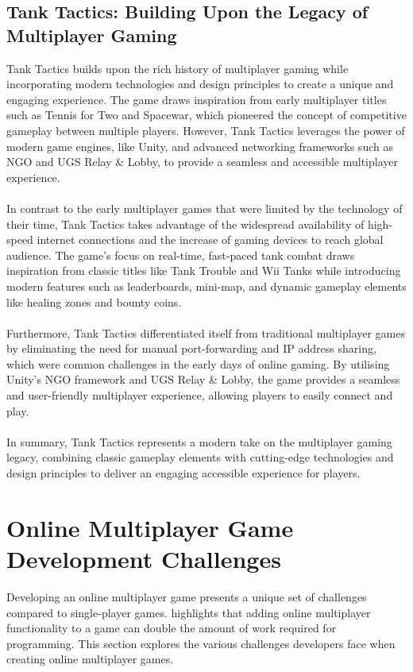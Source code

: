 \subsection{Tank Tactics: Building Upon the Legacy of Multiplayer Gaming}
Tank Tactics builds upon the rich history of multiplayer gaming while incorporating modern technologies and design principles to create a unique and engaging experience. The game draws inspiration from early multiplayer titles such as Tennis for Two and Spacewar, which pioneered the concept of competitive gameplay between multiple players. However, Tank Tactics leverages the power of modern game engines, like Unity, and advanced networking frameworks such as NGO and UGS Relay \& Lobby, to provide a seamless and accessible multiplayer experience.
\\
\noindent
\\
In contrast to the early multiplayer games that were limited by the technology of their time, Tank Tactics takes advantage of the widespread availability of high-speed internet connections and the increase of gaming devices to reach global audience. The game's focus on real-time, fast-paced tank combat draws inspiration from classic titles like Tank Trouble and Wii Tanks while introducing modern features such as leaderboards, mini-map, and dynamic gameplay elements like healing zones and bounty coins.
\\
\noindent
\\
Furthermore, Tank Tactics differentiated itself from traditional multiplayer games by eliminating the need for manual port-forwarding and IP address sharing, which were common challenges in the early days of online gaming. By utilising Unity's NGO framework and UGS Relay \& Lobby, the game provides a seamless and user-friendly multiplayer experience, allowing players to easily connect and play.
\\
\noindent
\\
In summary, Tank Tactics represents a modern take on the multiplayer gaming legacy, combining classic gameplay elements with cutting-edge technologies and design principles to deliver an engaging accessible experience for players.

\section{Online Multiplayer Game Development Challenges} 
Developing an online multiplayer game presents a unique set of challenges compared to single-player games. \cite{adding-mutliplayer} highlights that adding online multiplayer functionality to a game can double the amount of work required for programming. This section explores the various challenges developers face when creating online multiplayer games.

